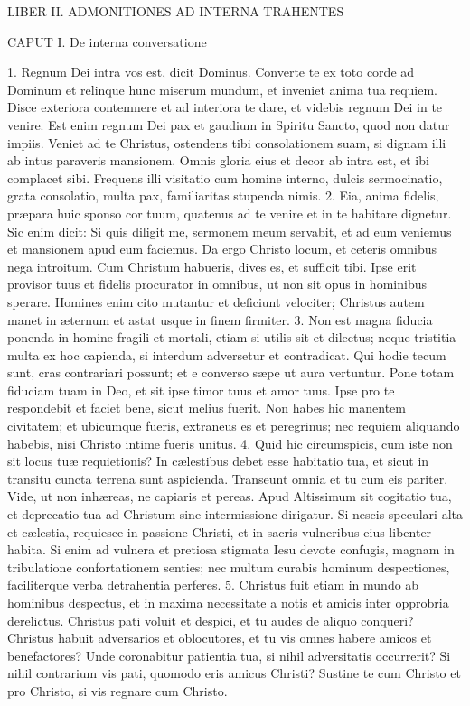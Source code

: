 LIBER II.
ADMONITIONES AD INTERNA TRAHENTES

CAPUT I.
De interna conversatione

1. Regnum Dei intra vos est, dicit Dominus. Converte te ex toto corde ad Dominum et relinque hunc miserum mundum, et inveniet anima tua requiem. Disce exteriora contemnere et ad interiora te dare, et videbis regnum Dei in te venire. Est enim regnum Dei pax et gaudium in Spiritu Sancto, quod non datur impiis. Veniet ad te Christus, ostendens tibi consolationem suam, si dignam illi ab intus paraveris mansionem. Omnis gloria eius et decor ab intra est, et ibi complacet sibi. Frequens illi visitatio cum homine interno, dulcis sermocinatio, grata consolatio, multa pax, familiaritas stupenda nimis.
2. Eia, anima fidelis, præpara huic sponso cor tuum, quatenus ad te venire et in te habitare dignetur. Sic enim dicit: Si quis diligit me, sermonem meum servabit, et ad eum veniemus et mansionem apud eum faciemus. Da ergo Christo locum, et ceteris omnibus nega introitum. Cum Christum habueris, dives es, et sufficit tibi. Ipse erit provisor tuus et fidelis procurator in omnibus, ut non sit opus in hominibus sperare. Homines enim cito mutantur et deficiunt velociter; Christus autem manet in æternum et astat usque in finem firmiter.
3. Non est magna fiducia ponenda in homine fragili et mortali, etiam si utilis sit et dilectus; neque tristitia multa ex hoc capienda, si interdum adversetur et contradicat. Qui hodie tecum sunt, cras contrariari possunt; et e converso sæpe ut aura vertuntur. Pone totam fiduciam tuam in Deo, et sit ipse timor tuus et amor tuus. Ipse pro te respondebit et faciet bene, sicut melius fuerit. Non habes hic manentem civitatem; et ubicumque fueris, extraneus es et peregrinus; nec requiem aliquando habebis, nisi Christo intime fueris unitus.
4. Quid hic circumspicis, cum iste non sit locus tuæ requietionis? In cælestibus debet esse habitatio tua, et sicut in transitu cuncta terrena sunt aspicienda. Transeunt omnia et tu cum eis pariter. Vide, ut non inhæreas, ne capiaris et pereas. Apud Altissimum sit cogitatio tua, et deprecatio tua ad Christum sine intermissione dirigatur. Si nescis speculari alta et cælestia, requiesce in passione Christi, et in sacris vulneribus eius libenter habita. Si enim ad vulnera et pretiosa stigmata Iesu devote confugis, magnam in tribulatione confortationem senties; nec multum curabis hominum despectiones, faciliterque verba detrahentia perferes.
5. Christus fuit etiam in mundo ab hominibus despectus, et in maxima necessitate a notis et amicis inter opprobria derelictus. Christus pati voluit et despici, et tu audes de aliquo conqueri? Christus habuit adversarios et oblocutores, et tu vis omnes habere amicos et benefactores? Unde coronabitur patientia tua, si nihil adversitatis occurrerit? Si nihil contrarium vis pati, quomodo eris amicus Christi? Sustine te cum Christo et pro Christo, si vis regnare cum Christo.
